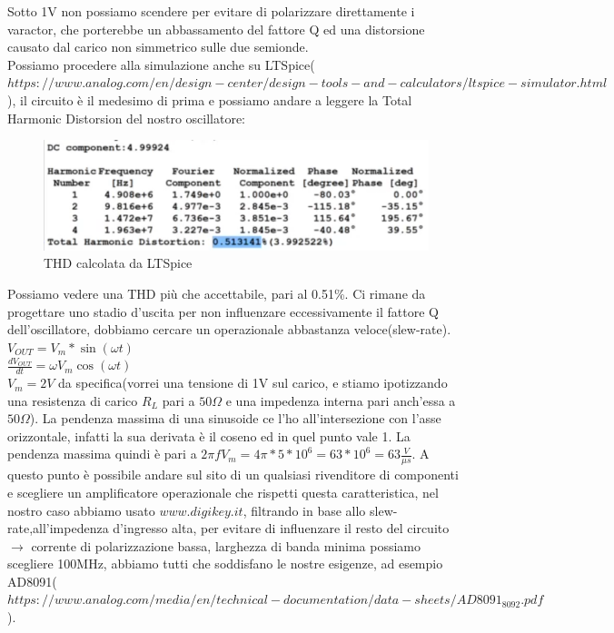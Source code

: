 \documentclass{article}
\begin{document}
Sotto 1V non possiamo scendere per evitare di polarizzare direttamente i varactor, che porterebbe un abbassamento del fattore Q ed una distorsione causato dal carico non simmetrico sulle due semionde.\\Possiamo procedere alla simulazione anche su LTSpice($https://www.analog.com/en/design-center/design-tools-and-calculators/ltspice-simulator.html$), il circuito è il medesimo di prima e possiamo andare a leggere la Total Harmonic Distorsion del nostro oscillatore:
~\begin{figure}[H]
\includegraphics[width=\textwidth]{THDLT.png}
\centering
\caption{THD calcolata da LTSpice}
\label{fig:foo}
\end{figure}
Possiamo vedere una THD più che accettabile, pari al 0.51\%.
Ci rimane da progettare uno stadio d'uscita per non influenzare eccessivamente il fattore Q dell'oscillatore, dobbiamo cercare un operazionale abbastanza veloce(slew-rate).
$V_{OUT}=V_m * \sin(\omega t) $\\$\frac{dV_{OUT}}{dt}=\omega V_m \cos(\omega t)$\\$V_m=2V$ da specifica(vorrei una tensione di 1V sul carico, e stiamo ipotizzando una resistenza di carico $R_L$ pari a $50\Omega$ e una impedenza interna pari anch'essa a $50\Omega$).
La pendenza massima di una sinusoide ce l'ho all'intersezione con l'asse orizzontale, infatti la sua derivata è il coseno ed in quel punto vale 1.
La pendenza massima quindi è pari a $2 \pi f V_m=4\pi * 5 *10^6=63*10^6=63\frac{V}{\mu s}$.
A questo punto è possibile andare sul sito di un qualsiasi rivenditore di componenti e scegliere un amplificatore operazionale che rispetti questa caratteristica, nel nostro caso abbiamo usato $www.digikey.it$, filtrando in base allo slew-rate,all'impedenza d'ingresso alta, per evitare di influenzare il resto del circuito $\rightarrow$ corrente di polarizzazione bassa, larghezza di banda minima possiamo scegliere 100MHz, abbiamo tutti che soddisfano le nostre esigenze, ad esempio AD8091($https://www.analog.com/media/en/technical-documentation/data-sheets/AD8091_8092.pdf$).
\end{document}

